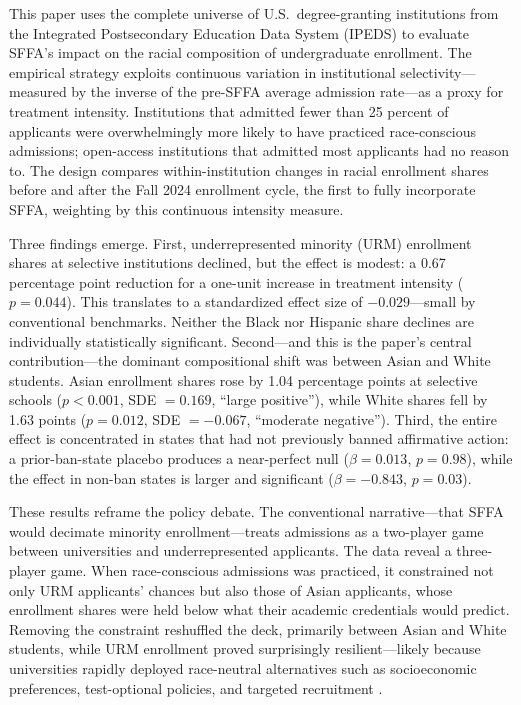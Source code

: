 \documentclass[12pt]{article}
\begin{document}
This paper uses the complete universe of U.S.\ degree-granting institutions from the Integrated Postsecondary Education Data System (IPEDS) to evaluate SFFA's impact on the racial composition of undergraduate enrollment. The empirical strategy exploits continuous variation in institutional selectivity---measured by the inverse of the pre-SFFA average admission rate---as a proxy for treatment intensity. Institutions that admitted fewer than 25 percent of applicants were overwhelmingly more likely to have practiced race-conscious admissions; open-access institutions that admitted most applicants had no reason to. The design compares within-institution changes in racial enrollment shares before and after the Fall 2024 enrollment cycle, the first to fully incorporate SFFA, weighting by this continuous intensity measure.

Three findings emerge. First, underrepresented minority (URM) enrollment shares at selective institutions declined, but the effect is modest: a 0.67 percentage point reduction for a one-unit increase in treatment intensity ($p = 0.044$). This translates to a standardized effect size of $-0.029$---small by conventional benchmarks. Neither the Black nor Hispanic share declines are individually statistically significant. Second---and this is the paper's central contribution---the dominant compositional shift was between Asian and White students. Asian enrollment shares rose by 1.04 percentage points at selective schools ($p < 0.001$, SDE $= 0.169$, ``large positive''), while White shares fell by 1.63 points ($p = 0.012$, SDE $= -0.067$, ``moderate negative''). Third, the entire effect is concentrated in states that had not previously banned affirmative action: a prior-ban-state placebo produces a near-perfect null ($\beta = 0.013$, $p = 0.98$), while the effect in non-ban states is larger and significant ($\beta = -0.843$, $p = 0.03$).

These results reframe the policy debate. The conventional narrative---that SFFA would decimate minority enrollment---treats admissions as a two-player game between universities and underrepresented applicants. The data reveal a three-player game. When race-conscious admissions was practiced, it constrained not only URM applicants' chances but also those of Asian applicants, whose enrollment shares were held below what their academic credentials would predict. Removing the constraint reshuffled the deck, primarily between Asian and White students, while URM enrollment proved surprisingly resilient---likely because universities rapidly deployed race-neutral alternatives such as socioeconomic preferences, test-optional policies, and targeted recruitment \citep{kahlenberg_2023}.
\end{document}
